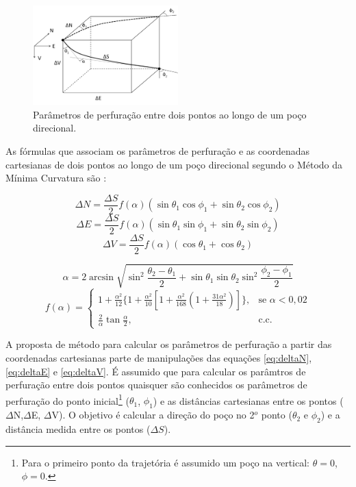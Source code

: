 \documentclass[final,3p,12pt]{elsarticle}
\begin{document}
\begin{figure}[h]
    \centering
    \includegraphics[width=0.5\textwidth]{Parametros}
    \caption{Parâmetros de perfuração entre dois pontos ao longo de um poço direcional.}
    \label{fig:parametros}
\end{figure}


As fórmulas que associam os parâmetros de perfuração e as coordenadas cartesianas de dois pontos ao longo de um poço direcional segundo o Método da Mínima Curvatura são \cite{10.2118/84246-MS}:

\begin{equation} \label{eq:deltaN}
    \Delta N = \frac{\Delta S}{2} f(\alpha) (\sin \theta_1 \cos \phi_1 + \sin \theta_2 \cos \phi_2)
\end{equation}
\begin{equation} \label{eq:deltaE}
    \Delta E = \frac{\Delta S}{2} f(\alpha) (\sin \theta_1 \sin \phi_1 + \sin \theta_2 \sin \phi_2)
\end{equation}
\begin{equation} \label{eq:deltaV}
    \Delta V = \frac{\Delta S}{2} f(\alpha) (\cos \theta_1 + \cos \theta_2)
\end{equation}

\begin{equation} \label{eq:alpha}
    \alpha = 2 \arcsin \sqrt{ \sin^2 \frac{\theta_2-\theta_1}{2} + \sin \theta_1 \sin \theta_2 \sin^2 \frac{\phi_2-\phi_1}{2} }
\end{equation}
\begin{equation} \label{eq:f_alpha}
    f(\alpha)= \begin{cases}
        1+\frac{\alpha^2}{12}\{1+\frac{\alpha^2}{10}[1+\frac{\alpha^2}{168}(1+\frac{31\alpha^2}{18})]\},&\text{se } \alpha<0,02 \\
        \frac{2}{\alpha}\tan{\frac{\alpha}{2}},&\text{c.c. }  
    \end{cases}
\end{equation}

A proposta de método para calcular os parâmetros de perfuração a partir das coordenadas cartesianas parte de manipulações das equações \ref{eq:deltaN}, \ref{eq:deltaE} e \ref{eq:deltaV}. É assumido que para calcular os parâmtros de perfuração entre dois pontos quaisquer são conhecidos os parâmetros de perfuração do ponto inicial\footnote{Para o primeiro ponto da trajetória é assumido um poço na vertical: $\theta=0$, $\phi=0$.} ($\theta_1$, $\phi_1$) e as distâncias cartesianas entre os pontos ($\Delta$N,$\Delta$E, $\Delta$V). O objetivo é calcular a direção do poço no 2$^o$ ponto ($\theta_2$ e $\phi_2$) e a distância medida entre os pontos ($\Delta S$).
\end{document}
